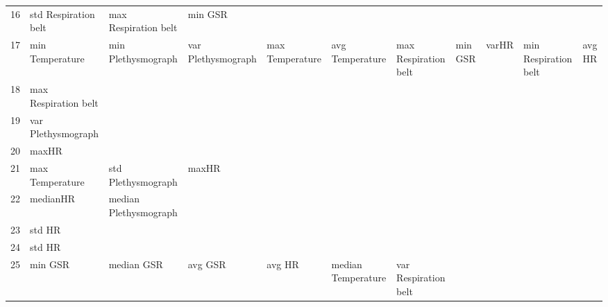 \begin{landscape}
\begin{table}[]
\begin{tabular}{l|llllllll}
16       & std Respiration belt    & max Respiration belt  & min GSR                 &                         &                         &                       &                      &          &                      &        \\
17       & min Temperature         & min Plethysmograph    & var Plethysmograph      & max Temperature         & avg Temperature         & max Respiration belt  & min GSR              & varHR    & min Respiration belt & avg HR \\
18       & max Respiration belt    &                       &                         &                         &                         &                       &                      &          &                      &        \\
19       & var Plethysmograph      &                       &                         &                         &                         &                       &                      &          &                      &        \\
20       & maxHR                   &                       &                         &                         &                         &                       &                      &          &                      &        \\
21       & max Temperature         & std Plethysmograph    & maxHR                   &                         &                         &                       &                      &          &                      &        \\
22       & medianHR                & median Plethysmograph &                         &                         &                         &                       &                      &          &                      &        \\
23       & std HR                  &                       &                         &                         &                         &                       &                      &          &                      &        \\
24       & std HR                  &                       &                         &                         &                         &                       &                      &          &                      &        \\
25       & min GSR                 & median GSR            & avg GSR                 & avg HR                  & median Temperature      & var Respiration belt  &                      &          &                      &        \\

\end{tabular}
\end{table}
\end{landscape}
